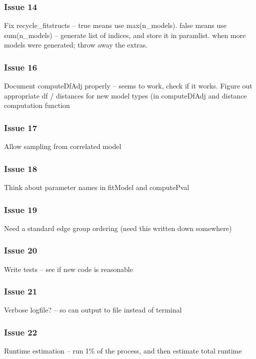\documentclass[11pt]{article}
\begin{document}
\subsubsection*{Issue 14}
Fix recycle\_fitstructs -- true means use max(n\_models). false means use sum(n\_models) -- generate list of indices, and store it in paramlist. when more models were generated; throw away the extras. 

\subsubsection*{Issue 16}
Document computeDfAdj properly -- seems to work, check if it works. 
Figure out appropriate df / distances for new model types (in computeDfAdj and distance computation function

\subsubsection*{Issue 17}
Allow sampling from correlated model

\subsubsection*{Issue 18}
Think about parameter names in fitModel and computePval

\subsubsection*{Issue 19}
Need a standard edge group ordering (need this written down somewhere)

\subsubsection*{Issue 20}
Write tests -- see if new code is reasonable

\subsubsection*{Issue 21}
Verbose logfile? -- so can output to file instead of terminal

\subsubsection*{Issue 22}
Runtime estimation -- run 1\% of the process, and then estimate total runtime

\end{document}
